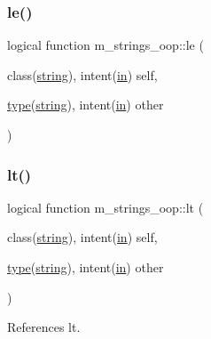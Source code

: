 \subsubsection{\texorpdfstring{le()}{le()}}
{\footnotesize\ttfamily logical function m\+\_\+strings\+\_\+oop\+::le (\begin{DoxyParamCaption}\item[{class(\hyperlink{structm__strings__oop_1_1string}{string}), intent(\hyperlink{M__journal_83_8txt_afce72651d1eed785a2132bee863b2f38}{in})}]{self,  }\item[{\hyperlink{stop__watch_83_8txt_a70f0ead91c32e25323c03265aa302c1c}{type}(\hyperlink{structm__strings__oop_1_1string}{string}), intent(\hyperlink{M__journal_83_8txt_afce72651d1eed785a2132bee863b2f38}{in})}]{other }\end{DoxyParamCaption})\hspace{0.3cm}{\ttfamily [private]}}

\mbox{\label{namespacem__strings__oop_a332288f9bebc563e12671b514512eb30}} 
\subsubsection{\texorpdfstring{lt()}{lt()}}
{\footnotesize\ttfamily logical function m\+\_\+strings\+\_\+oop\+::lt (\begin{DoxyParamCaption}\item[{class(\hyperlink{structm__strings__oop_1_1string}{string}), intent(\hyperlink{M__journal_83_8txt_afce72651d1eed785a2132bee863b2f38}{in})}]{self,  }\item[{\hyperlink{stop__watch_83_8txt_a70f0ead91c32e25323c03265aa302c1c}{type}(\hyperlink{structm__strings__oop_1_1string}{string}), intent(\hyperlink{M__journal_83_8txt_afce72651d1eed785a2132bee863b2f38}{in})}]{other }\end{DoxyParamCaption})\hspace{0.3cm}{\ttfamily [private]}}



References lt.

\mbox{\label{namespacem__strings__oop_aa424e1eccc45bb143172d6e212f8e408}} 
